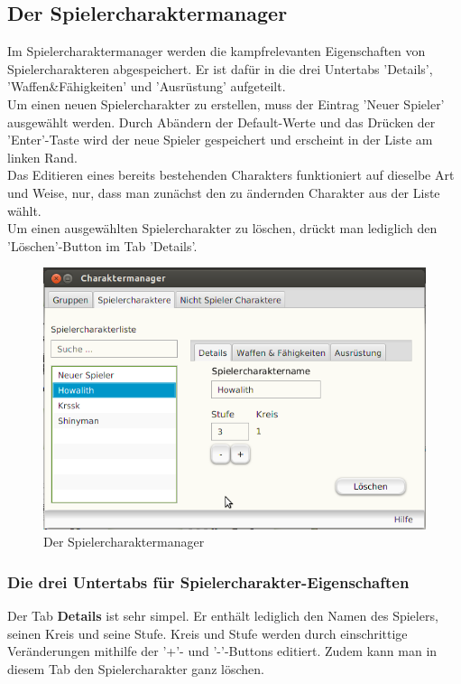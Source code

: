 \documentclass[11pt, a4paper, german]{article}
\begin{document}
\subsection{Der Spielercharaktermanager}\label{subsection:Spielercharaktermanager}
Im Spielercharaktermanager werden die kampfrelevanten Eigenschaften von Spielercharakteren abgespeichert. 
Er ist dafür in die drei Untertabs 'Details', 'Waffen\&Fähigkeiten' und 'Ausrüstung' aufgeteilt.\\

Um einen neuen Spielercharakter zu erstellen, muss der Eintrag 'Neuer Spieler' ausgewählt werden. Durch Abändern der Default-Werte und das Drücken der 'Enter'-Taste wird der neue Spieler gespeichert und erscheint in der Liste am linken Rand.\\
Das Editieren eines bereits bestehenden Charakters funktioniert auf dieselbe Art und Weise, nur, dass man zunächst den zu ändernden Charakter aus der Liste wählt.\\

Um einen ausgewählten Spielercharakter zu löschen, drückt man lediglich den 'Löschen'-Button im Tab 'Details'.
\begin{figure}
\centering
\includegraphics[width=1\linewidth]{Bilder/Spielercharaktermanager1}
\caption{Der Spielercharaktermanager}
\label{fig:Spielercharaktermanager}
\end{figure}

\subsubsection{Die drei Untertabs für Spielercharakter-Eigenschaften}
Der Tab \textbf{Details} ist sehr simpel. Er enthält lediglich den Namen des Spielers, seinen Kreis und seine Stufe. Kreis und Stufe werden durch einschrittige Veränderungen mithilfe der '+'- und '-'-Buttons editiert. Zudem kann man in diesem Tab den Spielercharakter ganz löschen.\\
\end{document}
